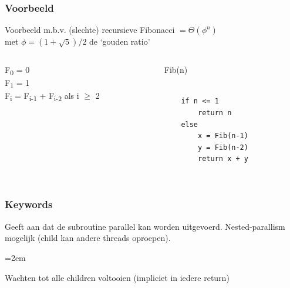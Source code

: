 \documentclass
   [kulak] %
   {kulakbeamer}
\begin{document}
\begin{frame}[fragile]
	\frametitle{Voorbeeld}
	
	Voorbeeld m.b.v. (slechte) recursieve Fibonacci $= \Theta(\phi^n)$ \\ met
	$\phi = (1 + \sqrt{5})/2$ de `gouden ratio'
	
	
	
	\begin{columns}[T] %
		
		
		
		\begin{column}{.48\textwidth}
			\begin{minipage}[c][.6\textheight][c]{\linewidth}
				F\textsubscript{0} = 0 \\
				F\textsubscript{1} = 1 \\
				F\textsubscript{i} = F\textsubscript{i-1} + F\textsubscript{i-2} als i $\geqslant$ 2  
				
				
				
				
				
			\end{minipage}
		\end{column}
		
		
		
		\begin{column}{.48\textwidth}
	
	Fib(n)
	\begin{lstlisting}[style=CStyle]
	
	if n <= 1
		return n
	else 
		x = Fib(n-1)
		y = Fib(n-2)
		return x + y
	
	\end{lstlisting}
	
	\end{column}
	
	
	
	

	\end{columns}
	
\end{frame}



\begin{frame}
	\frametitle{Keywords}
	
	\begin{description}
		\pause
		
		
		\item[\textbf{spawn}] Geeft aan dat de subroutine parallel kan worden uitgevoerd. Nested-parallism mogelijk (child kan andere threads oproepen).
		
		\pause
		\itemsep=2em
		\item[\textbf{sync}] Wachten tot alle children voltooien (impliciet in iedere return)
		
		
		
		
		
	\end{description}
	
	
\end{frame}
\end{document}
